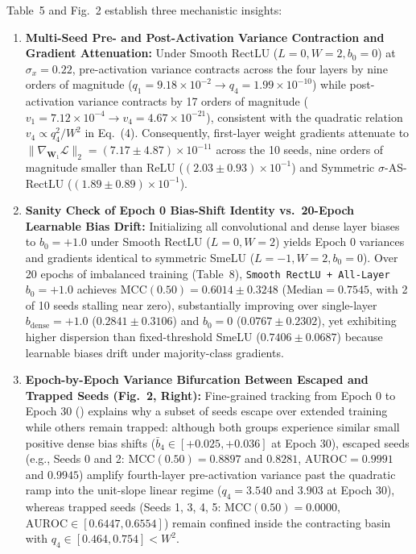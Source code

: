 \documentclass[11pt, a4paper]{article}
\begin{document}
Table~5 and Fig.~2 establish three mechanistic insights:
\begin{enumerate}
    \item \textbf{Multi-Seed Pre- and Post-Activation Variance Contraction and Gradient Attenuation:} Under Smooth RectLU ($L=0, W=2, b_{0}=0$) at $\sigma_{x}=0.22$, pre-activation variance contracts across the four layers by nine orders of magnitude ($q_{1} = 9.18 \times 10^{-2} \to q_{4} = 1.99 \times 10^{-10}$) while post-activation variance contracts by 17 orders of magnitude ($v_{1} = 7.12 \times 10^{-4} \to v_{4} = 4.67 \times 10^{-21}$), consistent with the quadratic relation $v_{4} \propto q_{4}^{2}/W^{2}$ in Eq.\ (4). Consequently, first-layer weight gradients attenuate to $\|\nabla_{\mathbf{W}_{1}}\mathcal{L}\|_{2} = (7.17 \pm 4.87) \times 10^{-11}$ across the 10 seeds, nine orders of magnitude smaller than ReLU ($(2.03 \pm 0.93) \times 10^{-1}$) and Symmetric $\sigma$-AS-RectLU ($(1.89 \pm 0.89) \times 10^{-1}$).
    \item \textbf{Sanity Check of Epoch 0 Bias-Shift Identity vs.\ 20-Epoch Learnable Bias Drift:} Initializing all convolutional and dense layer biases to $b_{0} = +1.0$ under Smooth RectLU ($L=0, W=2$) yields Epoch 0 variances and gradients identical to symmetric SmeLU ($L=-1, W=2, b_{0}=0$). Over 20 epochs of imbalanced training (Table~8), \texttt{Smooth RectLU + All-Layer $b_{0}=+1.0$} achieves $\text{MCC}(0.50) = 0.6014 \pm 0.3248$ ($\text{Median} = 0.7545$, with 2 of 10 seeds stalling near zero), substantially improving over single-layer $b_{\text{dense}}=+1.0$ ($0.2841 \pm 0.3106$) and $b_{0}=0$ ($0.0767 \pm 0.2302$), yet exhibiting higher dispersion than fixed-threshold SmeLU ($0.7406 \pm 0.0687$) because learnable biases drift under majority-class gradients.
    \item \textbf{Epoch-by-Epoch Variance Bifurcation Between Escaped and Trapped Seeds (Fig.\ 2, Right):} Fine-grained tracking from Epoch 0 to Epoch 30 () explains why a subset of seeds escape over extended training while others remain trapped: although both groups experience similar small positive dense bias shifts ($\bar{b}_{4} \in [+0.025, +0.036]$ at Epoch 30), escaped seeds (e.g., Seeds 0 and 2: $\text{MCC}(0.50) = 0.8897$ and $0.8281$, $\text{AUROC} = 0.9991$ and $0.9945$) amplify fourth-layer pre-activation variance past the quadratic ramp into the unit-slope linear regime ($q_{4} = 3.540$ and $3.903$ at Epoch 30), whereas trapped seeds (Seeds 1, 3, 4, 5: $\text{MCC}(0.50) = 0.0000$, $\text{AUROC} \in [0.6447, 0.6554]$) remain confined inside the contracting basin with $q_{4} \in [0.464, 0.754] < W^{2}$.


\end{enumerate}
\end{document}

